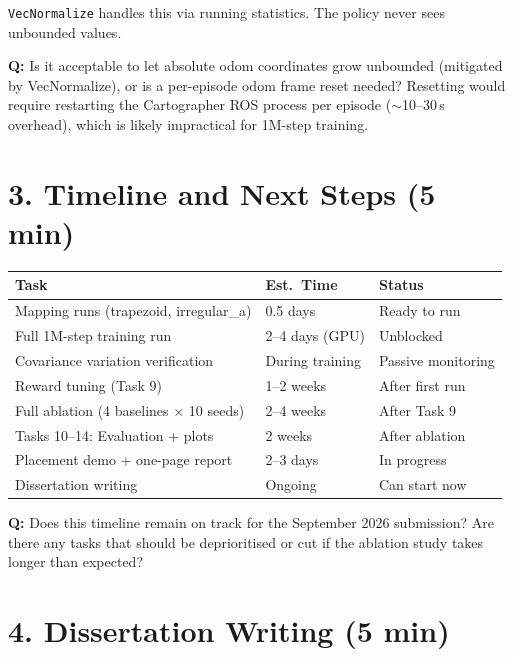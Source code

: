 \documentclass[11pt,a4paper]{article}
\newcommand{\question}[1]{\textcolor{question}{\textbf{Q:}} #1}
\begin{document}
\texttt{VecNormalize} handles this via running statistics. The policy never
sees unbounded values.

\question{Is it acceptable to let absolute odom coordinates grow unbounded
(mitigated by VecNormalize), or is a per-episode odom frame reset needed?
Resetting would require restarting the Cartographer ROS process per episode
($\sim$10--30\,s overhead), which is likely impractical for 1M-step training.}

\section*{3. Timeline and Next Steps (5 min)}

\begin{table}[h]
\centering
\small
\begin{tabular}{@{}lll@{}}
\toprule
\textbf{Task} & \textbf{Est.\ Time} & \textbf{Status} \\
\midrule
Mapping runs (trapezoid, irregular\_a) & 0.5 days & Ready to run \\
Full 1M-step training run & 2--4 days (GPU) & Unblocked \\
Covariance variation verification & During training & Passive monitoring \\
Reward tuning (Task 9) & 1--2 weeks & After first run \\
Full ablation (4 baselines $\times$ 10 seeds) & 2--4 weeks & After Task 9 \\
Tasks 10--14: Evaluation + plots & 2 weeks & After ablation \\
Placement demo + one-page report & 2--3 days & In progress \\
Dissertation writing & Ongoing & Can start now \\
\bottomrule
\end{tabular}
\end{table}

\question{Does this timeline remain on track for the September 2026 submission?
Are there any tasks that should be deprioritised or cut if the ablation
study takes longer than expected?}

\section*{4. Dissertation Writing (5 min)}
\end{document}
